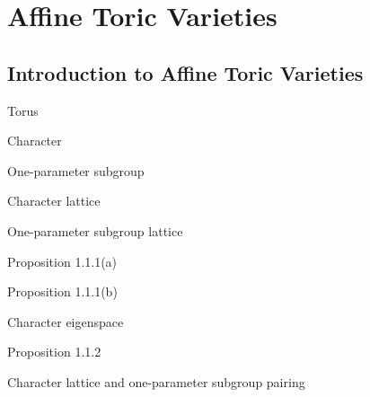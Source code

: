 \section{Affine Toric Varieties}

\subsection{Introduction to Affine Toric Varieties}

\begin{definition}
  \label{torusOver}
  \leanok
  Torus
\end{definition}

\begin{definition}
  \label{char}
  Character
\end{definition}

\begin{definition}
  \label{one_ps}
  One-parameter subgroup
\end{definition}

\begin{definition}
  \label{char_lattice}
  Character lattice
\end{definition}

\begin{definition}
  \label{ops_lattice}
  One-parameter subgroup lattice
\end{definition}

\begin{proposition}
  \label{prop:1.1.1.a}
  Proposition 1.1.1(a)
\end{proposition}

\begin{proposition}
  \label{prop:1.1.1.b}
  Proposition 1.1.1(b)
\end{proposition}

\begin{definition}
  \label{char_eigenspace}
  Character eigenspace
\end{definition}

\begin{proposition}
  \label{prop:1.1.2}
  Proposition 1.1.2
\end{proposition}

\begin{definition}
  \label{char_ops_pairing}
  Character lattice and one-parameter subgroup pairing
\end{definition}

